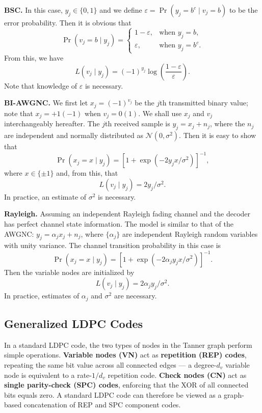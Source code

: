 \documentclass[11pt]{article}
\begin{document}
\textbf{BSC.} In this case, $y_j \in \{0,1\}$ and we define $\varepsilon = \Pr(y_j = b^c \mid v_j = b)$ to be the error probability. Then it is obvious that
\[
\Pr(v_j = b \mid y_j) =
\begin{cases}
1-\varepsilon, & \text{when } y_j = b, \\
\varepsilon, & \text{when } y_j = b^c.
\end{cases}
\]
From this, we have
\[
L(v_j \mid y_j) = (-1)^{y_j}\log\left(\frac{1-\varepsilon}{\varepsilon}\right).
\]
Note that knowledge of $\varepsilon$ is necessary.

\textbf{BI-AWGNC.} We first let $x_j = (-1)^{v_j}$ be the $j$th transmitted binary value; note that $x_j = +1(-1)$ when $v_j = 0(1)$. We shall use $x_j$ and $v_j$ interchangeably hereafter. The $j$th received sample is $y_j = x_j + n_j$, where the $n_j$ are independent and normally distributed as $\mathcal{N}(0,\sigma^2)$. Then it is easy to show that
\[
\Pr(x_j = x \mid y_j) = \left[1 + \exp\left(-2y_jx/\sigma^2\right)\right]^{-1},
\]
where $x \in \{\pm 1\}$ and, from this, that
\[
L(v_j \mid y_j) = 2y_j/\sigma^2.
\]
In practice, an estimate of $\sigma^2$ is necessary.

\textbf{Rayleigh.} Assuming an independent Rayleigh fading channel and the decoder has perfect channel state information. The model is similar to that of the AWGNC: $y_j= \alpha_j x_j + n_j$, where $\{ \alpha_j \}$ are independent Rayleigh random variables with unity variance. The channel transition probability in this case is
\[
\Pr(x_j = x \mid y_j) = \left[1 + \exp\left(-2\alpha_j y_j x/\sigma^2\right)\right]^{-1}.
\]
Then the variable nodes are initialized by
\[
L(v_j \mid y_j) = 2\alpha_j y_j/\sigma^2.
\]
In practice, estimates of $\alpha_j$ and $\sigma^2$ are necessary.

\clearpage
\subsection{Generalized LDPC Codes}
In a standard LDPC code, the two types of nodes in the Tanner graph perform 
simple operations. \textbf{Variable nodes (VN)} act as \textbf{repetition (REP) 
codes}, repeating the same bit value across all connected edges --- a degree-$d_v$ 
variable node is equivalent to a rate-$1/d_v$ repetition code. \textbf{Check nodes 
(CN)} act as \textbf{single parity-check (SPC) codes}, enforcing that the XOR of 
all connected bits equals zero. A standard LDPC code can therefore be viewed as a 
graph-based concatenation of REP and SPC component codes.
\end{document}
